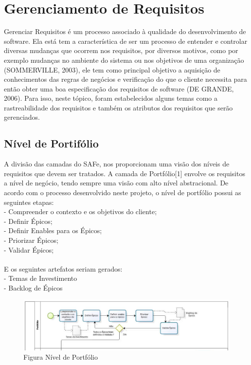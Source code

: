 \chapter[Gerenciamento de Requisitos]{Gerenciamento de Requisitos}

Gerenciar Requisitos é um processo associado à qualidade do desenvolvimento de software. Ela está tem a característica de ser um processo de entender e controlar diversas mudanças que ocorrem nos requisitos, por diversos motivos, como por exemplo mudanças no ambiente do sistema ou nos objetivos de uma organização (SOMMERVILLE, 2003), ele tem como principal objetivo a aquisição de conhecimentos das regras de negócios e verificação do que o cliente necessita para então obter uma boa especificação dos requisitos de software (DE GRANDE, 2006). Para isso, neste tópico, foram estabelecidos alguns temas como a rastreabilidade dos requisitos e também os atributos dos requisitos que serão gerenciados.
\\
\section{Nível de Portifólio}
A divisão das camadas do SAFe, nos proporcionam uma visão dos níveis de requisitos que devem ser tratados. A camada de Portfólio[1] envolve os requisitos a nível de negócio, tendo sempre uma visão com alto nível abstracional. De acordo com o processo desenvolvido neste projeto, o nível de portfólio possui as seguintes etapas:\\
\tab - Compreender o contexto e os objetivos do cliente;\\
\tab - Definir Épicos;\\
\tab - Definir Enables para os Épicos;\\
\tab - Priorizar Épicos;\\
\tab - Validar Épicos;\\
\\
E os seguintes artefatos seriam gerados:\\
\tab - Temas de Investimento\\
\tab - Backlog de Épicos\\

\begin{figure}[h]
    \centering
    \label{fig01}
        \includegraphics[keepaspectratio=true,scale=0.4]{figuras/nivelPortfolioRequisitos.eps}
    \caption{Figura Nível de Portfólio}
\end{figure}

